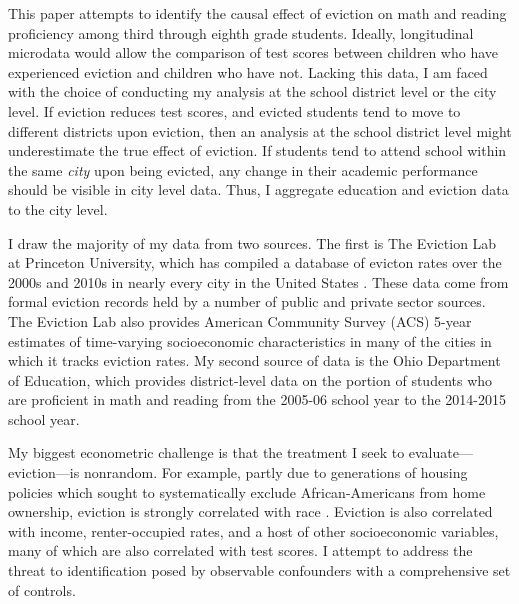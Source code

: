 \documentclass[12pt]{article}
\begin{document}
This paper attempts to identify the causal effect of eviction on math and reading proficiency among third through eighth grade students. Ideally, longitudinal microdata would allow the comparison of test scores between children who have experienced eviction and children who have not. Lacking this data, I am faced with the choice of conducting my analysis at the school district level or the city level. If eviction reduces test scores, and evicted students tend to move to different districts upon eviction, then an analysis at the school district level might underestimate the true effect of eviction. If students tend to attend school within the same \textit{city} upon being evicted, any change in their academic performance should be visible in city level data. Thus, I aggregate education and eviction data to the city level.

I draw the majority of my data from two sources. The first is The Eviction Lab at Princeton University, which has compiled a database of evicton rates over the 2000s and 2010s in nearly every city in the United States \citep{desmond_eviction_2018}. These data come from formal eviction records held by a number of public and private sector sources. The Eviction Lab also provides American Community Survey (ACS) 5-year estimates of time-varying socioeconomic characteristics in many of the cities in which it tracks eviction rates. My second source of data is the Ohio Department of Education, which provides district-level data on the portion of students who are proficient in math and reading from the 2005-06 school year to the 2014-2015 school year.

My biggest econometric challenge is that the treatment I seek to evaluate—eviction—is nonrandom. For example, partly due to generations of housing policies which sought to systematically exclude African-Americans from home ownership, eviction is strongly correlated with race \citep{rothstein_color_2017}. Eviction is also correlated with income, renter-occupied rates, and a host of other socioeconomic variables, many of which are also correlated with test scores. I attempt to address the threat to identification posed by observable confounders with a comprehensive set of controls.
\end{document}
